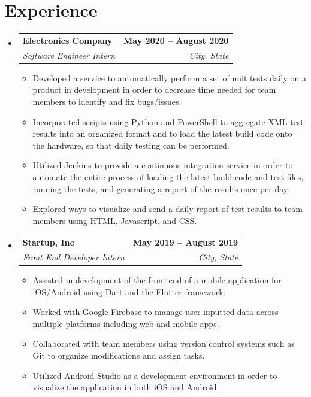 \documentclass[letterpaper,11pt]{article}
\makeatletter
\newcommand{\resumeItem}[1]{
  \item\small{
    {#1 \vspace{-2pt}}
  }
}
\newcommand{\resumeSubheading}[4]{
  \vspace{-2pt}\item
    \begin{tabular*}{1.0\textwidth}[t]{l@{\extracolsep{\fill}}r}
      \textbf{#1} & \textbf{\small #2} \\
      \textit{\small#3} & \textit{\small #4} \\
    \end{tabular*}\vspace{-7pt}
}
\newcommand{\resumeSubHeadingListStart}{\begin{itemize}[leftmargin=0.0in, label={}]}
\newcommand{\resumeSubHeadingListEnd}{\end{itemize}}
\newcommand{\resumeItemListStart}{\begin{itemize}}
\newcommand{\resumeItemListEnd}{\end{itemize}\vspace{-5pt}}
\makeatother
\begin{document}
\section{Experience}
  \resumeSubHeadingListStart

    \resumeSubheading
      {Electronics Company}{May 2020 -- August 2020}
      {Software Engineer Intern}{City, State}
      \resumeItemListStart
        \resumeItem{Developed a service to automatically perform a set of unit tests daily on a product in development in order to decrease time needed for team members to identify and fix bugs/issues.}
        \resumeItem{Incorporated scripts using Python and PowerShell to aggregate XML test results into an organized format and to load the latest build code onto the hardware, so that daily testing can be performed.}
        \resumeItem{Utilized Jenkins to provide a continuous integration service in order to automate the entire process of loading the latest build code and test files, running the tests, and generating a report of the results once per day.}
        \resumeItem{Explored ways to visualize and send a daily report of test results to team members  using HTML, Javascript, and CSS.}
      \resumeItemListEnd

    \resumeSubheading
      {Startup, Inc}{May 2019 -- August 2019}
      {Front End Developer Intern}{City, State}
      \resumeItemListStart
        \resumeItem{Assisted in development of the front end of a mobile application for iOS/Android using Dart and the Flutter framework.}
        \resumeItem{Worked with Google Firebase to manage user inputted data across multiple platforms including web and mobile apps.}
        \resumeItem{Collaborated with team members using version control systems such as Git to organize modifications and assign tasks.}
        \resumeItem{Utilized Android Studio as a development environment in order to visualize the application in both iOS and Android.}
    \resumeItemListEnd
    
  \resumeSubHeadingListEnd
\vspace{-16pt}

\end{document}
